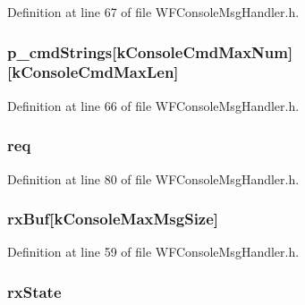Definition at line 67 of file W\+F\+Console\+Msg\+Handler.\+h.

\hypertarget{structt_console_context_a2f68fab83114dfa5468078ffdb5e603b}{}
\subsubsection[{p\+\_\+cmd\+Strings}]{ p\+\_\+cmd\+Strings\mbox{[}k\+Console\+Cmd\+Max\+Num\mbox{]}\mbox{[}k\+Console\+Cmd\+Max\+Len\mbox{]}}\label{structt_console_context_a2f68fab83114dfa5468078ffdb5e603b}


Definition at line 66 of file W\+F\+Console\+Msg\+Handler.\+h.

\hypertarget{structt_console_context_ad3093f7cdd8076441d3f527dbc105c1c}{}
\subsubsection[{req}]{ req}\label{structt_console_context_ad3093f7cdd8076441d3f527dbc105c1c}


Definition at line 80 of file W\+F\+Console\+Msg\+Handler.\+h.

\hypertarget{structt_console_context_af9b91afb7d6d9d14fd957c1fbcc904aa}{}
\subsubsection[{rx\+Buf}]{ rx\+Buf\mbox{[}k\+Console\+Max\+Msg\+Size\mbox{]}}\label{structt_console_context_af9b91afb7d6d9d14fd957c1fbcc904aa}


Definition at line 59 of file W\+F\+Console\+Msg\+Handler.\+h.

\hypertarget{structt_console_context_a48cf2a4fe3b62ee7f4f54dab3847d191}{}
\subsubsection[{rx\+State}]{ rx\+State}\label{structt_console_context_a48cf2a4fe3b62ee7f4f54dab3847d191}


